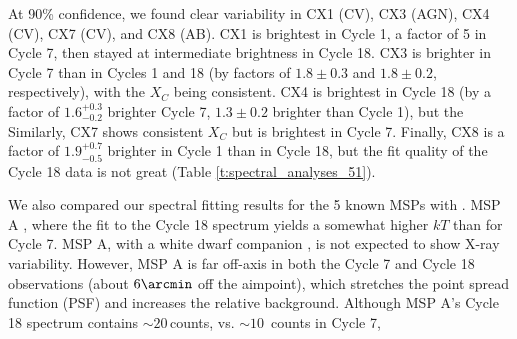\documentclass[fleqn,usenatbib]{mnras}
\newcommand{\kev}{\mbox{keV}}
\newcommand{\craig}[1]{{\color{black}{#1}}}
\newcommand{\revised}[1]{{\color{black}{#1}}}
\begin{document}
At  90\% confidence, we found clear variability in CX1 (CV), CX3 (AGN), CX4 (CV), CX7 (CV), and CX8 (AB). CX1 is brightest in Cycle 1,  %
\revised{dimmed by}
a factor of 5 
in Cycle 7, then stayed at intermediate brightness in Cycle 18. CX3 is %
brighter in %
Cycle 7 %
than in Cycles 1 and 18 (by factors of $1.8\pm 0.3$ and $1.8\pm 0.2$, respectively), with the $X_C$ being consistent. CX4 is brightest in Cycle 18 (by a factor of $1.6^{+0.3}_{-0.2}$ brighter %
\revised{vs.}
Cycle 7, %
\revised{and}
$1.3\pm 0.2$ brighter than Cycle 1), but the \revised{$X_C$s are consistent.} %
Similarly, CX7 shows consistent $X_C$ but is brightest in %
Cycle 7. 
Finally, %
CX8 is a factor of $1.9^{+0.7}_{-0.5}$ brighter in Cycle 1 than in Cycle 18, but %
the fit quality of the Cycle 18 data is not great (Table \ref{t:spectral_analyses_51}). 

We also compared our spectral fitting results for the 5 known MSPs with %
\revised{that of}
\citet{Forestell14}. %
MSP A \revised{appears variable}, where the fit to the Cycle 18 spectrum yields a somewhat higher $kT$ than for Cycle 7. MSP A, with a white dwarf companion \citep{Ferraro03a,Bassa03}, is not expected to show X-ray variability.
However, %
MSP A is far off-axis in both the Cycle 7 and Cycle 18 observations (about $6\arcmin$ off the aimpoint), which stretches the point spread function (PSF) and 
increases the relative background.
Although MSP A's Cycle 18 spectrum contains $\sim 20$\,counts, %
vs. $\sim 10$\, counts in Cycle 7, %
\craig{we cannot obtain clearer constraints.} %
\end{document}
